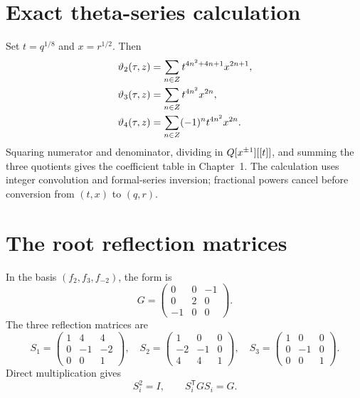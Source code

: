 \chapter{Exact theta-series calculation}\label{app:theta-computation}
Set $t=q^{1/8}$ and $x=r^{1/2}$. Then
\[
\begin{aligned}
\vartheta_2(\tau,z)&=\sum_{n\in Z}t^{4n^2+4n+1}x^{2n+1},\\
\vartheta_3(\tau,z)&=\sum_{n\in Z}t^{4n^2}x^{2n},\\
\vartheta_4(\tau,z)&=\sum_{n\in Z}(-1)^nt^{4n^2}x^{2n}.
\end{aligned}
\]
Squaring numerator and denominator, dividing in $Q[x^{\pm1}][[t]]$, and summing the three quotients gives the coefficient table in Chapter~1. The calculation uses integer convolution and formal-series inversion; fractional powers cancel before conversion from $(t,x)$ to $(q,r)$.

\chapter{The root reflection matrices}
In the basis $(f_2,f_3,f_{-2})$, the form is
\[
 G=\begin{pmatrix}0&0&-1\\0&2&0\\-1&0&0\end{pmatrix}.
\]
The three reflection matrices are
\[
 S_1=\begin{pmatrix}1&4&4\\0&-1&-2\\0&0&1\end{pmatrix},\quad
 S_2=\begin{pmatrix}1&0&0\\-2&-1&0\\4&4&1\end{pmatrix},\quad
 S_3=\begin{pmatrix}1&0&0\\0&-1&0\\0&0&1\end{pmatrix}.
\]
Direct multiplication gives
\[
 S_i^2=I,
 \qquad S_i^{\mathsf T}GS_i=G.
\]

